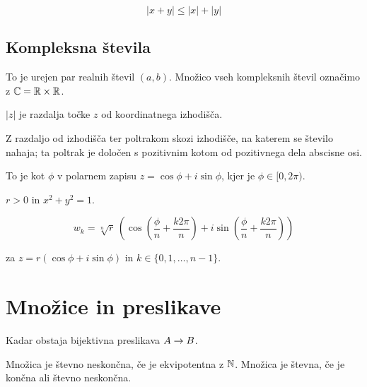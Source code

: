 
\[
	\left|x+y\right| \le \left|x\right| + \left|y\right|
\]

\subsection{Kompleksna števila}


To je urejen par realnih števil $(a,b)$. Množico vseh kompleksnih števil označimo z $\mathbb{C} = \mathbb{R} \times \mathbb{R}$.


$|z|$ je razdalja točke $z$ od koordinatnega izhodišča.


Z razdaljo od izhodišča ter poltrakom skozi izhodišče, na katerem se število nahaja; ta poltrak je določen s pozitivnim kotom od pozitivnega dela abscisne osi.


To je kot $\phi$ v polarnem zapisu $z = \cos \phi + i \sin \phi$, kjer je $\phi \in [0, 2\pi)$.


$r>0$ in $x^2 + y^2 = 1$.


\[
	w_k = \sqrt[n]{r} \,(\cos (\frac{\phi}{n} + \frac{k2\pi}{n}) + i \sin(\frac{\phi}{n} + \frac{k2\pi}{n}))
\]

za $z = r(\cos\phi + i\sin\phi)$ in $k \in \{0, 1, \ldots, n-1\}$.

\section{Množice in preslikave}


Kadar obstaja bijektivna preslikava $A \to B$.


Množica je števno neskončna, če je ekvipotentna z $\mathbb{N}$. Množica je števna, če je končna ali števno neskončna.

